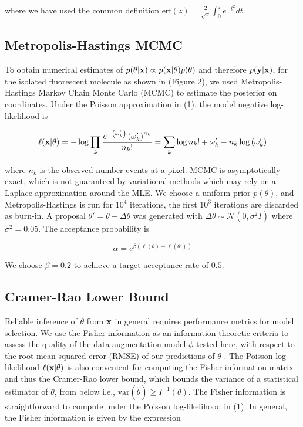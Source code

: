 \documentclass{article}
\begin{document}
where we have used the common definition $\mathrm{erf}(z) = \frac{2}{\sqrt{\pi}}\int_{0}^{z}e^{-t^{2}}dt$. 

\subsection{Metropolis-Hastings MCMC}

To obtain numerical estimates of $p(\theta|\bold{x})\propto p(\bold{x}|\theta)p(\theta)$ and therefore $p(\bold{y}|\bold{x})$, for the isolated fluorescent molecule as shown in (Figure 2), we used Metropolis-Hastings Markov Chain Monte Carlo (MCMC) to estimate the posterior on coordinates. Under the Poisson approximation in (1), the model negative log-likelihood is

\begin{equation}
\ell(\bold{x}|\theta) = -\log \prod_{k} \frac{e^{-\left(\omega_{k}'\right)}\left(\omega_{k}'\right)^{n_{k}}}{n_{k}!} = \sum_{k}  \log n_{k}! + \omega_{k}' - n_{k}\log\left(\omega_{k}'\right)
\end{equation}

where $n_{k}$ is the observed number events at a pixel. MCMC is asymptotically exact, which is not guaranteed by variational methods which may rely on a Laplace approximation around the MLE. We choose a uniform prior $p(\theta)$, and Metropolis-Hastings is run for $10^4$ iterations, the first $10^{3}$ iterations are discarded as burn-in. A proposal $\theta' = \theta + \Delta\theta$ was generated with $\Delta\theta \sim \mathcal{N}(0,\sigma^{2}I)$ where $\sigma^{2}=0.05$. The acceptance probability is

\begin{equation*}
\alpha = e^{\beta(\ell(\theta)-\ell(\theta'))}
\end{equation*}

We choose $\beta=0.2$ to achieve a target acceptance rate of $0.5$.

\subsection{Cramer-Rao Lower Bound}

Reliable inference of $\theta$ from $\bold{x}$ in general requires performance metrics for model selection. We use the Fisher information as an information theoretic criteria to assess the quality of the data augmentation model $\phi$ tested here, with respect to the root mean squared error (RMSE) of our predictions of $\theta$ \citep{Chao2016}. The Poisson log-likelihood $\ell(\bold{x}|\theta)$ is also convenient for computing the Fisher information matrix \citep{Smith2010} and thus the Cramer-Rao lower bound, which bounds the variance of a statistical estimator of $\theta$, from below i.e., $\mathrm{var}(\hat{\theta}) \geq I^{-1}(\theta)$. The Fisher information is straightforward to compute under the Poisson log-likelihood in (1). In general, the Fisher information is given by the expression
\end{document}
